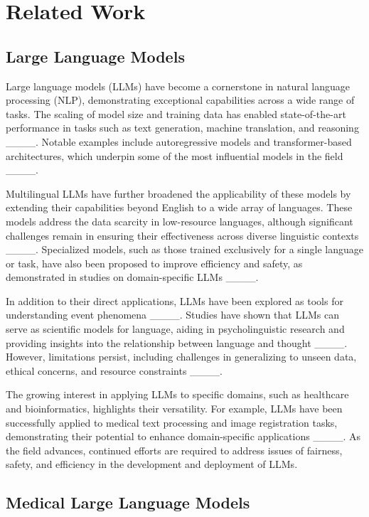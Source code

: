 \section{Related Work}
\subsection{Large Language Models}

Large language models (LLMs) have become a cornerstone in natural language processing (NLP), demonstrating exceptional capabilities across a wide range of tasks. The scaling of model size and training data has enabled state-of-the-art performance in tasks such as text generation, machine translation, and reasoning ____. Notable examples include autoregressive models and transformer-based architectures, which underpin some of the most influential models in the field ____.

Multilingual LLMs have further broadened the applicability of these models by extending their capabilities beyond English to a wide array of languages. These models address the data scarcity in low-resource languages, although significant challenges remain in ensuring their effectiveness across diverse linguistic contexts ____. Specialized models, such as those trained exclusively for a single language or task, have also been proposed to improve efficiency and safety, as demonstrated in studies on domain-specific LLMs ____.

In addition to their direct applications, LLMs have been explored as tools for understanding event phenomena ____. Studies have shown that LLMs can serve as scientific models for language, aiding in psycholinguistic research and providing insights into the relationship between language and thought ____. However, limitations persist, including challenges in generalizing to unseen data, ethical concerns, and resource constraints ____.

The growing interest in applying LLMs to specific domains, such as healthcare and bioinformatics, highlights their versatility. For example, LLMs have been successfully applied to medical text processing and image registration tasks, demonstrating their potential to enhance domain-specific applications ____. As the field advances, continued efforts are required to address issues of fairness, safety, and efficiency in the development and deployment of LLMs.


\subsection{Medical Large Language Models}

